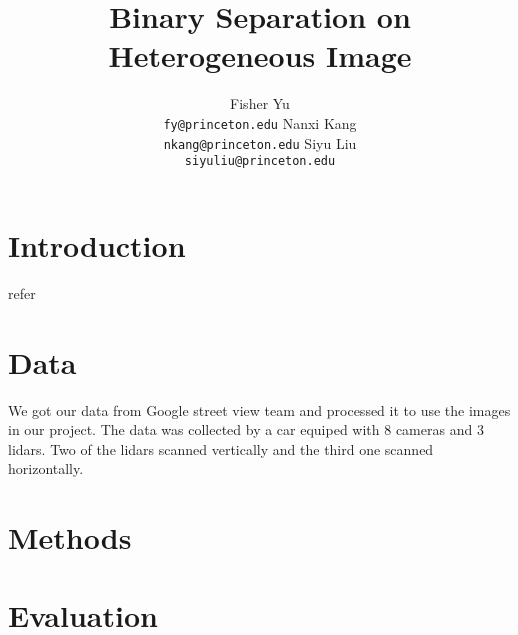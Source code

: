 \documentclass{article} %
\title{Binary Separation on Heterogeneous Image}
\author{
Fisher Yu \\
\texttt{fy@princeton.edu}
\And
Nanxi Kang \\
\texttt{nkang@princeton.edu} 
\And
Siyu Liu\\
\texttt{siyuliu@princeton.edu}
}
\begin{document}
\maketitle

\section{Introduction}
refer~\citet{Besag74}
\section{Data}
We got our data from Google street view team and processed it to use
the images in our project. The data was collected by a car equiped
with 8 cameras and 3 lidars. Two of the lidars scanned vertically and
the third one scanned horizontally. 
\section{Methods}

\section{Evaluation}




\end{document}
